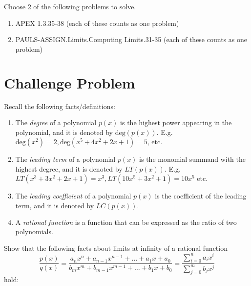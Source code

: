 \documentclass[12pt]{article}
\begin{document}
Choose 2 of the following problems to solve.

\begin{enumerate}
  \item APEX 1.3.35-38 (each of these counts as one problem)
  \item PAULS-ASSIGN.Limits.Computing Limits.31-35 (each of these counts as one problem)
\end{enumerate}

\section{Challenge Problem}
Recall the following facts/definitions:
\begin{enumerate}
  \item The \textit{degree} of a polynomial $p(x)$ is the highest power appearing in the polynomial, and it is denoted by $\mathrm{deg}(p(x))$. E.g. $\mathrm{deg}(x^2) = 2, \mathrm{deg}(x^5 + 4x^2 + 2x + 1) = 5$, etc.
  \item The \textit{leading term} of a polynomial $p(x)$ is the monomial summand with the highest degree, and it is denoted by $LT(p(x))$. E.g. $LT(x^3 + 3x^2 + 2x+1) = x^3, LT(10x^5 + 3x^2 + 1) = 10x^5$ etc.
  \item The \textit{leading coefficient} of a polynomial $p(x)$ is the coefficient of the leading term, and it is denoted by $LC(p(x))$.
  \item A \textit{rational function} is a function that can be expressed as the ratio of two polynomials.
\end{enumerate}

Show that the following facts about limits at infinity of a rational function 
\begin{equation*}
  \dfrac{p(x)}{q(x)} = \dfrac{a_n x^n + a_{n-1}x^{n-1} + \ldots + a_1 x + a_0}{b_m x^m + b_{m-1}x^{m-1} + \ldots + b_1 x + b_0} = \dfrac{\sum\limits_{i = 0}^n a_i x^i}{\sum\limits_{j = 0}^m b_j x^j}
\end{equation*}
hold:
\end{document}
